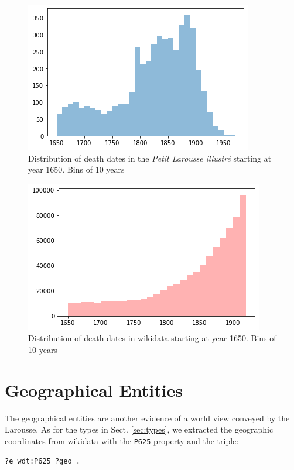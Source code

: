 \documentclass[10pt, a4paper]{article}
\begin{document}
\begin{figure}[t]
\centering
\includegraphics[width=\columnwidth]{img/morts.png} 
\caption{Distribution of death dates in the \textit{Petit Larousse illustré} starting at year 1650. Bins of 10 years}
\label{fig:morts}
\end{figure}
\begin{figure}[t]
\centering
\includegraphics[width=\columnwidth]{img/morts_wd.png} 
\caption{Distribution of death dates in wikidata starting at year 1650. Bins of 10 years}
\label{fig:morts_wd}
\end{figure}

\section{Geographical Entities}
The geographical entities are another evidence of a world view conveyed by the Larousse. As for the types in Sect. \ref{sec:types}, we extracted the geographic coordinates from wikidata with the \verb=P625= property and the triple:
\begin{verbatim}
?e wdt:P625 ?geo .
\end{verbatim}
\end{document}
